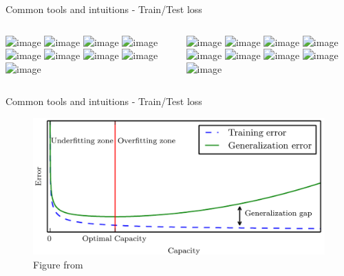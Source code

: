 \documentclass{irdbeamer}
\let\oldcite=\cite
\renewcommand{\cite}[1]{\textcolor[rgb]{.5,.5,.7}{\oldcite{#1}}}
\begin{document}
\begin{frame}{Common tools and intuitions - Train/Test loss}
    \begin{columns}
        \begin{column}{.5\linewidth}
    \centering
    \vspace{1cm}
    \includegraphics<1>[width = .8\textwidth]{./figs/plot/overfitting1.png}%
    \includegraphics<2>[width = .8\textwidth]{./figs/plot/overfitting2.png}%
    \includegraphics<3>[width = .8\textwidth]{./figs/plot/overfitting3.png}%
    \includegraphics<4>[width = .8\textwidth]{./figs/plot/overfitting4.png}%
    \includegraphics<5>[width = .8\textwidth]{./figs/plot/overfitting5.png}%
    \includegraphics<6>[width = .8\textwidth]{./figs/plot/overfitting6.png}%
    \includegraphics<7>[width = .8\textwidth]{./figs/plot/overfitting7.png}%
    \includegraphics<8>[width = .8\textwidth]{./figs/plot/overfitting8.png}%
    \includegraphics<9>[width = .8\textwidth]{./figs/plot/overfitting9.png}%
        \end{column}
        \begin{column}{.5\linewidth}
    \centering
    \includegraphics<1>[width = .8\textwidth]{./figs/plot/train_test_loss-1.png}%
    \includegraphics<2>[width = .8\textwidth]{./figs/plot/train_test_loss-2.png}%
    \includegraphics<3>[width = .8\textwidth]{./figs/plot/train_test_loss-3.png}%
    \includegraphics<4>[width = .8\textwidth]{./figs/plot/train_test_loss-4.png}%
    \includegraphics<5>[width = .8\textwidth]{./figs/plot/train_test_loss-5.png}%
    \includegraphics<6>[width = .8\textwidth]{./figs/plot/train_test_loss-6.png}%
    \includegraphics<7>[width = .8\textwidth]{./figs/plot/train_test_loss-7.png}%
    \includegraphics<8>[width = .8\textwidth]{./figs/plot/train_test_loss-8.png}%
    \includegraphics<9>[width = .8\textwidth]{./figs/plot/train_test_loss-9.png}%
        \end{column}
    \end{columns}
\end{frame}

\begin{frame}{Common tools and intuitions - Train/Test loss}
    \begin{figure}
        \centering
        \includegraphics[width = .8\textwidth]{./figs/goodfellow.png}
        \caption{\tiny Figure from \cite{goodfellow2016deep}}
    \end{figure}
\end{frame}
\end{document}
